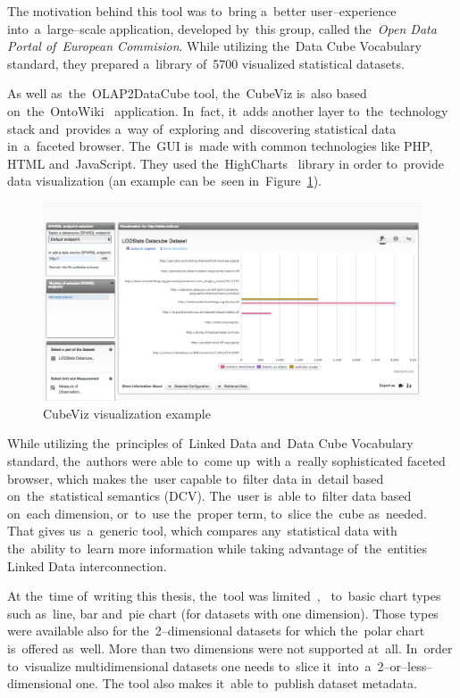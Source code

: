 The motivation behind this tool was to~bring a~better user--experience into~a~large--scale application, developed by~this group, called the~\emph{Open Data Portal of~European Commision}. While utilizing the~Data Cube Vocabulary standard, they 
prepared a~library of~5700 visualized statistical datasets.

\begin{sloppypar}
As well as~the~OLAP2DataCube tool, the~CubeViz is~also based on~the~\mbox{OntoWiki}~\cite{ontowiki}
application. In~fact, it~adds another layer to~the~technology stack and~provides a~way of~exploring and~discovering statistical 
data in~a~faceted browser. The~GUI is~made with common technologies like PHP,
HTML and~JavaScript. They used the~HighCharts~\cite{highcharts} library in
order to~provide data visualization (an example can be~seen in~Figure~\ref{fig:cubeviz}).
\end{sloppypar}

\begin{figure}
	\centering
	\includegraphics[width=140mm]{img/cubeviz.png}
	\caption{CubeViz visualization example}
	\label{fig:cubeviz}
\end{figure}

While utilizing the~principles of~Linked Data and~Data Cube Vocabulary 
standard, the~authors were able to~come up~with a~really sophisticated faceted 
browser, which makes the~user capable to~filter data in~detail based on~the~statistical 
semantics (DCV). The~user is~able to~filter data based on~each dimension, or~to~use the~proper term, to~slice the~cube as~needed. That gives us~a~generic tool, which 
compares any~statistical data with the~ability to~learn more 
information while taking advantage of~the~entities Linked Data interconnection.

At the~time of~writing this thesis, the~tool was limited~\cite{cubeviz-paper-1},~\cite{cubeviz-paper} to~basic chart types
such as~line, bar and~pie chart (for datasets with one dimension). Those types 
were available also for the~2--dimensional datasets for which the~polar 
chart is~offered as~well. More than two dimensions were not supported at~all. In~order to~visualize 
multidimensional datasets one needs to~slice it~into~a~2--or--less--dimensional one.
The tool also makes it~able to~publish dataset metadata.

